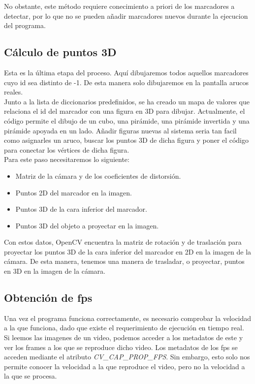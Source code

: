 \documentclass{article}
\begin{document}
No obstante, este método requiere conecimiento a priori de los marcadores a detectar, por lo que no se pueden añadir marcadores nuevos durante la ejecucion del programa.

\subsection{Cálculo de puntos 3D}
Esta es la última etapa del proceso. Aquí dibujaremos todos aquellos marcadores cuyo id sea distinto de -1. De esta manera solo dibujaremos en la pantalla arucos reales.\\

Junto a la lista de diccionarios predefinidos, se ha creado un mapa de valores que relaciona el id del marcador con una figura en 3D para dibujar. Actualmente, el código permite el dibujo de un cubo, una pirámide, una pirámide invertida y una pirámide apoyada en un lado. Añadir figuras nuevas al sistema seria tan facil como asignarles un aruco, buscar los puntos 3D de dicha figura y poner el código para conectar los vértices de dicha figura.\\

Para este paso necesitaremos lo siguiente:
\begin{itemize}
\item Matriz de la cámara y de los coeficientes de distorsión.
\item Puntos 2D del marcador en la imagen.
\item Puntos 3D de la cara inferior del marcador.
\item Puntos 3D del objeto a proyectar en la imagen.
  \end{itemize}

  Con estos datos, OpenCV encuentra la matriz de rotación y de traslación para proyectar los puntos 3D de la cara inferior del marcador en 2D en la imagen de la cámara. De esta manera, tenemos una manera de trasladar, o proyectar, puntos en 3D en la imagen de la cámara.

  \subsection{Obtención de fps}

  Una vez el programa funciona correctamente, es necesario comprobar la velocidad a la que funciona, dado que existe el requerimiento de ejecución en tiempo real.\\

Si leemos las imagenes de un video, podemos acceder a los metadatos de este y ver los frames a los que se reproduce dicho video. Los metadatos de los fps se acceden mediante el atributo \textit{CV\_CAP\_PROP\_FPS}. Sin embargo, esto solo nos permite conocer la velocidad a la que reproduce el video, pero no la velocidad a la que se procesa.\\
  
\end{document}
